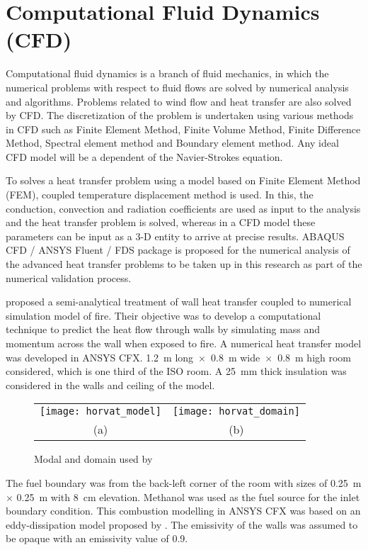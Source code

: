 \section{Computational Fluid Dynamics (CFD)}

Computational fluid dynamics is a branch of fluid mechanics, in which the numerical problems with respect to fluid flows are solved by numerical analysis and algorithms. Problems related to wind flow and heat transfer are also solved by CFD. The discretization of the problem is undertaken using various methods in CFD such as Finite Element Method, Finite Volume Method, Finite Difference Method, Spectral element method and Boundary element method. Any ideal CFD model will be a dependent of the Navier-Strokes equation.  

To solves a heat transfer problem using a model based on Finite Element Method (FEM), coupled temperature displacement method is used. In this, the conduction, convection and radiation coefficients are used as input to the analysis and the heat transfer problem is solved, whereas in a CFD model these parameters can be input as a 3-D entity to arrive at precise results. ABAQUS CFD / ANSYS Fluent / FDS package is proposed for the numerical analysis of the advanced heat transfer problems to be taken up in this research as part of the numerical validation process.

\citet{Horvat2009} proposed a semi-analytical treatment of wall heat transfer coupled to numerical simulation model of fire. Their objective was to develop a computational technique to predict the heat flow through walls by simulating mass and momentum across the wall when exposed to fire. A numerical heat transfer model was developed in ANSYS CFX.  1.2~m long~$\times$~0.8~m wide~$\times$~0.8~m high room considered, which is one third of the ISO room. A 25~mm thick insulation was considered in the walls and ceiling of the model.
\begin{figure}[htbp]
	\centering
		\begin{tabular}{cc}
			\texttt{[image: horvat\_model]} &
			\texttt{[image: horvat\_domain]} \\ 
			(a) & (b) \\ 
		\end{tabular} 
		\caption{Modal and domain used by \citet{Horvat2009}}
		\label{fig:horvat_model}
\end{figure}

The fuel boundary was from the back-left corner of the room with sizes of 0.25~m $\times$ 0.25~m with 8~cm elevation. Methanol was used as the fuel source for the inlet boundary condition. This combustion modelling in ANSYS CFX was based on an eddy-dissipation model proposed by \citet{Magnussen1977}. The emissivity of the walls was assumed to be opaque with an emissivity value of 0.9.

